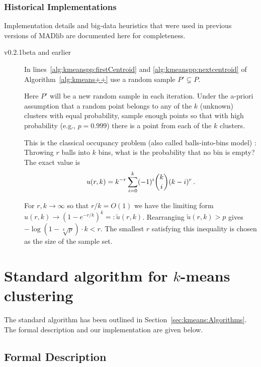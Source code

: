 \subsubsection{Historical Implementations}

Implementation details and big-data heuristics that were used in previous versions of MADlib are documented here for completeness.

\begin{description}
	\item[v0.2.1beta and earlier] In lines~\ref{alg:kmeanspp:firstCentroid} and \ref{alg:kmeanspp:nextcentroid} of Algorithm~\ref{alg:kmeans++} use a random sample $P' \subsetneq P$.

		Here $P'$ will be a new random sample in each iteration. Under the a-priori assumption that a random point belongs to any of the $k$ (unknown) clusters with equal probability, sample enough points so that with high probability (e.g., $p = 0.999$) there is a point from each of the $k$ clusters.

		This is the classical occupancy problem (also called balls-into-bins model) \cite{F68a}: Throwing $r$ balls into $k$ bins, what is the probability that no bin is empty? The exact value is
		\begin{align*}
			u(r, k) = k^{-r} \sum_{i=0}^k (-1)^i \binom ki (k - i)^r
			\SiM.
		\end{align*}

		For $r,k \to \infty$ so that $r/k = O(1)$ we have the limiting form $u(r,k) \to (1 - e^{-r/k})^k =: \widetilde u(r, k)$. Rearranging $\widetilde u(r, k) > p$ gives $-\log(1 - \sqrt[k]p) \cdot k < r$. The smallest $r$ satisfying this inequality is chosen as the size of the sample set.
\end{description}

\section[Standard algorithm for k-means clustering]{Standard algorithm for $k$-means clustering}

The standard algorithm has been outlined in Section~\ref{sec:kmeans:Algorithms}. The formal description and our implementation are given below.

\subsection{Formal Description}

